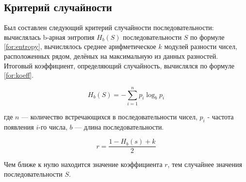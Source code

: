 \subsection{Критерий случайности}

Был составлен следующий критерий случайности последовательности: вычислялась b-арная энтропия $H_b(S)$ последовательности $S$ по формуле \ref{for:entropy}, вычислялось среднее арифметическое $k$ модулей разности чисел, расположенных рядом, делёных на максимальную из данных разностей. Итоговый коэффициент, определяющий случайность, вычислялся по формуле \ref{for:koeff}.

\begin{equation}
	\label{for:entropy}
	H_b(S) = - \sum_{i=1}^{n} p_i \log_b p_i
\end{equation}

где $n$ --- количество встречающихся в последовательности чисел, $p_i$ - частота появления $i$-го числа, $b$ --- длина последовательности.

\begin{equation}
	\label{for:koeff}
	r = \frac{1 - H_b(s) + k}{2}
\end{equation}

Чем ближе к нулю находится значение коэффициента $r$, тем случайнее значения последовательности $S$.

